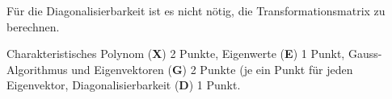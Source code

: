 \begin{diskussion}
Für die Diagonalisierbarkeit ist es nicht nötig, die Transformationsmatrix
zu berechnen.
\end{diskussion}

\begin{bewertung}
Charakteristisches Polynom ({\bf X}) 2 Punkte,
Eigenwerte ({\bf E}) 1 Punkt,
Gauss-Algorithmus und Eigenvektoren ({\bf G}) 2 Punkte (je ein Punkt
für jeden Eigenvektor,
Diagonalisierbarkeit ({\bf D}) 1 Punkt.
\end{bewertung}
